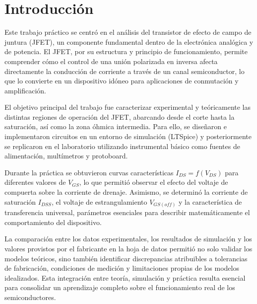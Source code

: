 \chapter{Introducción}

Este trabajo práctico se centró en el análisis del transistor de efecto de campo de juntura (JFET), un
componente fundamental dentro de la electrónica analógica y de potencia. El JFET, por su estructura y
principio de funcionamiento, permite comprender cómo el control de una unión polarizada en inversa
afecta directamente la conducción de corriente a través de un canal semiconductor, lo que lo convierte
en un dispositivo idóneo para aplicaciones de conmutación y amplificación.  

El objetivo principal del trabajo fue caracterizar experimental y teóricamente las distintas regiones 
de operación del JFET, abarcando desde el corte hasta la saturación, así como la zona óhmica 
intermedia. Para ello, se diseñaron e implementaron circuitos en un entorno de simulación (LTSpice) 
y posteriormente se replicaron en el laboratorio utilizando instrumental básico como fuentes de 
alimentación, multímetros y protoboard.  

Durante la práctica se obtuvieron curvas características $I_{DS} = f(V_{DS})$ para diferentes valores 
de $V_{GS}$, lo que permitió observar el efecto del voltaje de compuerta sobre la corriente de drenaje. 
Asimismo, se determinó la corriente de saturación $I_{DSS}$, el voltaje de estrangulamiento 
$V_{GS(off)}$ y la característica de transferencia universal, parámetros esenciales para describir 
matemáticamente el comportamiento del dispositivo.  

La comparación entre los datos experimentales, los resultados de simulación y los valores provistos 
por el fabricante en la hoja de datos permitió no solo validar los modelos teóricos, sino también 
identificar discrepancias atribuibles a tolerancias de fabricación, condiciones de medición y 
limitaciones propias de los modelos idealizados. Esta integración entre teoría, simulación y práctica 
resulta esencial para consolidar un aprendizaje completo sobre el funcionamiento real de los 
semiconductores.   
